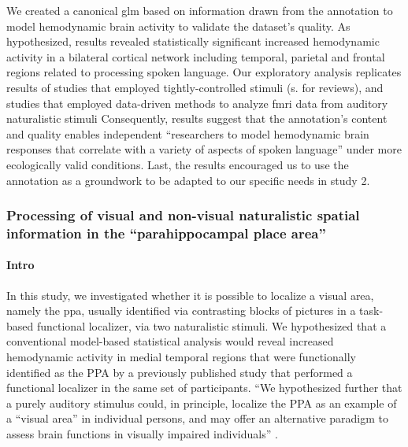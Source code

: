 We created a canonical \ac{glm} based on information drawn from the annotation
to model hemodynamic brain activity to validate the dataset's quality.
As hypothesized, results revealed statistically significant increased
hemodynamic activity in a bilateral cortical network including temporal,
parietal and frontal regions related to processing spoken language.
Our exploratory analysis replicates results of studies that employed
tightly-controlled stimuli (s. \citep{friederici2011brain,
hickok2007cortical,price2012twentyyears} for reviews), and studies that employed
data-driven methods to analyze \ac{fmri} data from auditory naturalistic stimuli
\citep{honey2012not, lerner2011topographic, silbert2014coupled}
Consequently, results suggest that the annotation's content and quality enables
independent ``researchers to model hemodynamic brain responses that correlate
with a variety of aspects of spoken language'' \citep{haeusler2021speechanno}
under more ecologically valid conditions.
Last, the results encouraged us to use the annotation as a groundwork to be
adapted to our specific needs in study 2.


\subsubsection{Processing of visual and non-visual naturalistic spatial
information in the ``parahippocampal place area''}




\paragraph{Intro}

In this study, we investigated whether it is possible to localize a visual area,
namely the \ac{ppa}, usually identified via contrasting blocks of pictures in a
task-based functional localizer, via two naturalistic stimuli.
We hypothesized that a conventional model-based statistical analysis would
reveal increased hemodynamic activity in medial temporal regions that were
functionally identified as the PPA by a previously published study
\citep{sengupta2016extension} that performed a functional localizer in the same
set of participants.
``We hypothesized further that a purely auditory stimulus could, in principle,
localize the PPA as an example of a ``visual area'' in individual persons,
%
and may offer an alternative paradigm to assess brain functions in visually
impaired individuals'' \citep{haeusler2022processing}.



